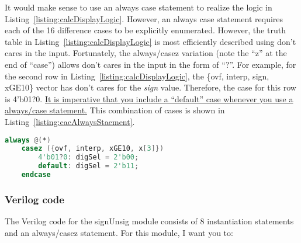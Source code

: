    It would make sense to use an always case statement to realize the logic
    in Listing~\ref{listing:calcDisplayLogic}. However, an always case statement requires each of the 16
    difference cases to be explicitly enumerated. However, the truth table
    in Listing~\ref{listing:calcDisplayLogic} is most efficiently described using don't cares in the
    input. Fortunately, the always/casez variation (note the ``z'' at the
    end of ``case'') allows don't cares in the input in the form of ``?''.
    For example, for the second row in Listing~\ref{listing:calcDisplayLogic}, the \{ovf, interp, sign,
    xGE10\} vector has don't cares for the \emph{sign} value. Therefore, the
    case for this row is 4'b01?0. \uline{It is imperative that you include a
    ``default'' case whenever you use a always/case statement.} This
    combination of cases is shown in Listing~\ref{listing:cacAlwaysStaement}.

\begin{lstlisting}[language=Verilog,
 caption={The always/casez statement allows don't cares in the input.},
 label={listing:cacAlwaysStaement},
 frame=single]
 always @(*)
    casez ({ovf, interp, xGE10, x[3]})
        4'b01?0: digSel = 2'b00;
        default: digSel = 2'b11;
    endcase

 \end{lstlisting}

    \subsubsection{ Verilog code}
    \protect\hypertarget{sigUnsign_Verilog}{}{}
    The Verilog code for the
    signUnsig module consists of 8 instantiation statements and an
    always/casez statement. For this module, I want you to:

